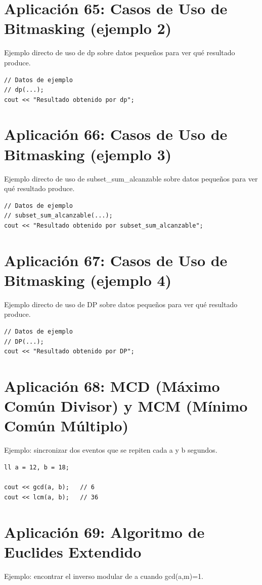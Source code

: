 \documentclass[10pt,twocolumn,letterpaper]{report}
\begin{document}
\section{Aplicación 65: Casos de Uso de Bitmasking (ejemplo 2)}
Ejemplo directo de uso de dp sobre datos pequeños para ver qué resultado produce.

\begin{lstlisting}
// Datos de ejemplo
// dp(...);
cout << "Resultado obtenido por dp";
\end{lstlisting}

\section{Aplicación 66: Casos de Uso de Bitmasking (ejemplo 3)}
Ejemplo directo de uso de subset\_sum\_alcanzable sobre datos pequeños para ver qué resultado produce.

\begin{lstlisting}
// Datos de ejemplo
// subset_sum_alcanzable(...);
cout << "Resultado obtenido por subset_sum_alcanzable";
\end{lstlisting}

\section{Aplicación 67: Casos de Uso de Bitmasking (ejemplo 4)}
Ejemplo directo de uso de DP sobre datos pequeños para ver qué resultado produce.

\begin{lstlisting}
// Datos de ejemplo
// DP(...);
cout << "Resultado obtenido por DP";
\end{lstlisting}

\section{Aplicación 68: MCD (Máximo Común Divisor) y MCM (Mínimo Común Múltiplo)}
Ejemplo: sincronizar dos eventos que se repiten cada a y b segundos.

\begin{lstlisting}
ll a = 12, b = 18;

cout << gcd(a, b);   // 6
cout << lcm(a, b);   // 36
\end{lstlisting}

\section{Aplicación 69: Algoritmo de Euclides Extendido}
Ejemplo: encontrar el inverso modular de a cuando gcd(a,m)=1.
\end{document}
